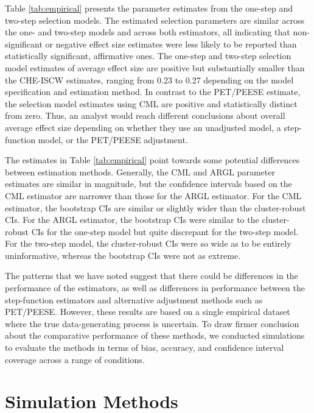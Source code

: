 \documentclass[
  man, donotrepeattitle,floatsintext]{apa7}
\begin{document}
Table \ref{tab:empirical} presents the parameter estimates from the one-step and two-step selection models.
The estimated selection parameters are similar across the one- and two-step models and across both estimators, all indicating that non-significant or negative effect size estimates were less likely to be reported than statistically significant, affirmative ones.
The one-step and two-step selection model estimates of average effect size are positive but substantially smaller than the CHE-ISCW estimates, ranging from 0.23 to 0.27 depending on the model specification and estimation method.
In contrast to the PET/PEESE estimate, the selection model estimates using CML are positive and statistically distinct from zero.
Thus, an analyst would reach different conclusions about overall average effect size depending on whether they use an unadjusted model, a step-function model, or the PET/PEESE adjustment.

The estimates in Table \ref{tab:empirical} point towards some potential differences between estimation methods.
Generally, the CML and ARGL parameter estimates are similar in magnitude, but the confidence intervals based on the CML estimator are narrower than those for the ARGL estimator.
For the CML estimator, the bootstrap CIs are similar or slightly wider than the cluster-robust CIs.
For the ARGL estimator, the bootstrap CIs were similar to the cluster-robust CIs for the one-step model but quite discrepant for the two-step model.
For the two-step model, the cluster-robust CIs were so wide as to be entirely uninformative, whereas the bootstrap CIs were not as extreme.

The patterns that we have noted suggest that there could be differences in the performance of the estimators, as well as differences in performance between the step-function estimators and alternative adjustment methods such as PET/PEESE.
However, these results are based on a single empirical dataset where the true data-generating process is uncertain.
To draw firmer conclusion about the comparative performance of these methods, we conducted simulations to evaluate the methods in terms of bias, accuracy, and confidence interval coverage across a range of conditions.

\section{Simulation Methods}\label{simulation-methods}
\end{document}
